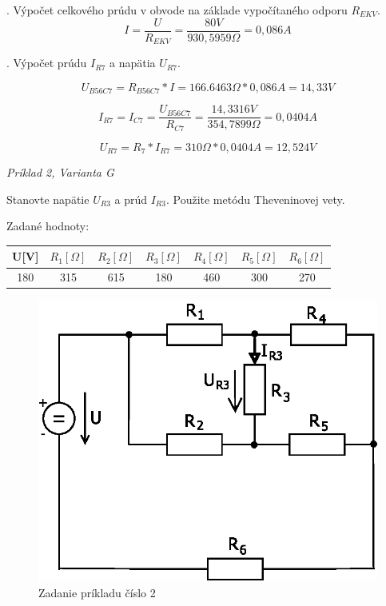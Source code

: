 \documentclass[a4paper,12pt]{article}
\begin{document}
. Výpočet celkového prúdu v obvode na základe vypočítaného odporu $R_{EKV}$.
\begin{equation}
I = \frac{U}{R_{EKV}} = \frac{80V}{930,5959\Omega} = 0,086A
\end{equation}

. Výpočet prúdu $I_{R7}$ a napätia $U_{R7}$.

\begin{equation}
U_{B56C7} = R_{B56C7} * I = 166.6463\Omega * 0,086A = 14,33V
\end{equation}

\begin{equation}
I_{R7} = I_{C7} = \frac{U_{B56C7}}{R_{C7}} = \frac{14,3316V}{354,7899\Omega} = 0,0404A
\end{equation}

\begin{equation}
U_{R7} = R_7 * I_{R7} = 310\Omega * 0,0404A = 12,524V
\end{equation}



\newpage
\begin{center}
\emph{Príklad 2, Varianta G}
\end{center}

\bigskip
Stanovte napätie
$U_{R3}$ a prúd $I_{R3}$.
Použite metódu Theveninovej vety.
\bigskip

Zadané hodnoty:
\begin{center}
\begin{tabular} {| c | c | c | c | c | c | c | }
\hline
U[V] & $R_1[\Omega]$ & $R_2[\Omega]$ & $R_3[\Omega]$ & $R_4[\Omega]$ & $R_5[\Omega]$ & $R_6[\Omega]$ \\ \hline
180 & 315 & 615 & 180 & 460 & 300 & 270  \\ \hline
\end{tabular}
\end{center}

\begin{figure}[!htb]
\centering
\includegraphics[scale=1.5]{p2/p0.eps}
\caption{Zadanie príkladu číslo 2}
\end{figure}
\end{document}
